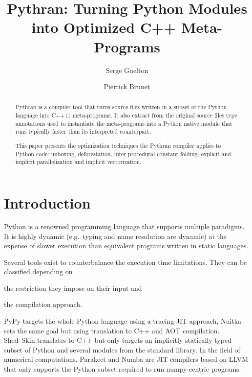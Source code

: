 \documentclass{llncs}
\title{Pythran: Turning Python Modules into Optimized C++ Meta-Programs}
\author{Serge Guelton\inst{1,2} \and Pierrick Brunet\inst{2}}
\institute{\'Ecole Normale Sup\'erieure, D\'epartement d'Informatique, Paris, France
\and
T\'el\'ecom Bretagne, Plouzan\'e, France
}
\begin{document}
\maketitle

\begin{abstract}

    Pythran is a compiler tool that turns source files written in a subset of
    the Python language into C++11 meta-programs. It also extract from the
    original source files type annotations used to instantiate the meta-programs
    into a Python native module that runs typically faster than its interpreted
    counterpart.

    This paper presents the optimization techniques the Pythran compiler applies
    to Python code: unboxing, deforestation, inter procedural constant folding,
    explicit and implicit parallelization and implicit vectorization.

\end{abstract}

\section{Introduction}

Python is a renowned programming language that supports multiple paradigms. It
is highly dynamic (e.g.\ typing and name resolution are dynamic) at the expense
of slower execution than equivalent programs written in static languages.

Several tools exist to counterbalance the execution time limitations. They can
be classified depending on
\begin{inparaenum}[1)]
\item the restriction they impose on their input and
\item the compilation approach.
\end{inparaenum}
PyPy\cite{pypy2009} targets the whole Python
language using a tracing \ac{JIT} approach, Nuitka\cite{nuitka2012} sets the same
goal but using translation to C++ and \ac{AOT} compilation.
Shed~Skin\cite{shedskin2006} translates to C++ but only targets an implicitly statically
typed subset of Python and several modules from the standard library. In the
field of numerical computations, Parakeet\cite{parakeet2012} and
Numba\cite{numba2013} are \ac{JIT} compilers based on LLVM that
only supports the Python subset required to run numpy-centric programs.
\end{document}
